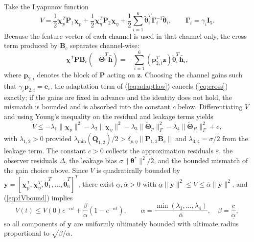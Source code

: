 \documentclass[Review,sageh,times]{sagej}
\begin{document}
Take the Lyapunov function
\begin{equation}
V = \frac{1}{2}\boldsymbol{\chi}_p^{T}\mathbf{P}_1\boldsymbol{\chi}_p
+ \frac{1}{2}\boldsymbol{\chi}_\eta^{T}\mathbf{P}_2\boldsymbol{\chi}_\eta
+ \frac{1}{2}\sum_{i=1}^{6}\tilde{\boldsymbol{\theta}}_i^{T}\boldsymbol{\Gamma}_i^{-1}\tilde{\boldsymbol{\theta}}_i ,
\qquad
\boldsymbol{\Gamma}_i=\gamma_i\mathbf{I}_5 .
\label{eq:V}
\end{equation}
Because the feature vector of each channel is used in that channel only, the
cross term produced by $\mathbf{B}_c$ separates channel-wise:
\begin{equation}
\boldsymbol{\chi}^{T}\mathbf{P}\mathbf{B}_c\left(-\tilde{\boldsymbol{\Theta}}^{T}\bar{\mathbf{h}}\right)
= -\sum_{i=1}^{6}\left(\mathbf{p}_{2,i}^{T}\mathbf{z}\right)\tilde{\boldsymbol{\theta}}_i^{T}\bar{\mathbf{h}}_i ,
\label{eq:cross}
\end{equation}
where $\mathbf{p}_{2,i}$ denotes the block of $\mathbf{P}$ acting on $\mathbf{z}$. Choosing the
channel gains such that $\gamma_i\mathbf{p}_{2,i}=\mathbf{e}_i$, the adaptation term of
(\ref{eq:adaptlaw}) cancels (\ref{eq:cross}) exactly; if the gains are fixed in advance and the
identity does not hold, the mismatch is bounded and is absorbed into the
constant $c$ below. Differentiating $V$ and using Young's inequality on the
residual and leakage terms yields
\begin{equation}
\dot V \le -\lambda_1\|\boldsymbol{\chi}_p\|^2 - \lambda_2\|\boldsymbol{\chi}_\eta\|^2
- \lambda_3\|\tilde{\boldsymbol{\Theta}}_p\|_F^2 - \lambda_4\|\tilde{\boldsymbol{\Theta}}_R\|_F^2 + c,
\label{eq:dVbound}
\end{equation}
with $\lambda_{1,2}>0$ provided
$\lambda_{\min}(\mathbf{Q}_{1,2})/2>\delta_{p,\eta}\|\mathbf{P}_{1,2}\mathbf{B}_c\|$ and
$\lambda_{3,4}=\sigma/2$ from the leakage term. The constant
$c>0$ collects the approximation residuals $\bar\varepsilon$, the observer
residuals $\bar\Delta$, the leakage bias $\sigma\|\boldsymbol{\theta}^{*}\|^2/2$, and the bounded
mismatch of the gain choice above. Since $V$ is quadratically bounded by
$\mathbf{y}=[\boldsymbol{\chi}_p^{T},\boldsymbol{\chi}_\eta^{T},\tilde{\boldsymbol{\theta}}_1^{T},\ldots,\tilde{\boldsymbol{\theta}}_6^{T}]^{T}$,
there exist $\underline{\alpha},\overline{\alpha}>0$ with
$\underline{\alpha}\|\mathbf{y}\|^2\le V\le\overline{\alpha}\|\mathbf{y}\|^2$, and (\ref{eq:dVbound}) implies
\begin{equation}
V(t)\le V(0)e^{-\alpha t}+\frac{\beta}{\alpha}\left(1-e^{-\alpha t}\right),
\qquad \alpha=\frac{\min(\lambda_1,\ldots,\lambda_4)}{\overline{\alpha}},\quad
\beta=\frac{c}{\underline{\alpha}},
\label{eq:Vsol}
\end{equation}
so all components of $\mathbf{y}$ are uniformly ultimately bounded with ultimate
radius proportional to $\sqrt{\beta/\alpha}$.
\end{document}
